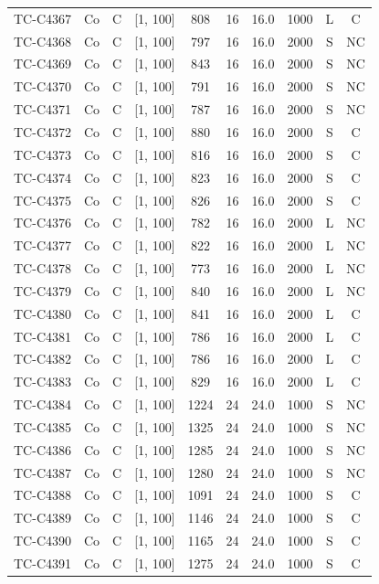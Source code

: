 \begin{longtable}{lccccccccc}
TC-C4367 & Co & C & [1, 100] & 808 & 16 & 16.0 & 1000 & L & C \\
TC-C4368 & Co & C & [1, 100] & 797 & 16 & 16.0 & 2000 & S & NC \\
TC-C4369 & Co & C & [1, 100] & 843 & 16 & 16.0 & 2000 & S & NC \\
TC-C4370 & Co & C & [1, 100] & 791 & 16 & 16.0 & 2000 & S & NC \\
TC-C4371 & Co & C & [1, 100] & 787 & 16 & 16.0 & 2000 & S & NC \\
TC-C4372 & Co & C & [1, 100] & 880 & 16 & 16.0 & 2000 & S & C \\
TC-C4373 & Co & C & [1, 100] & 816 & 16 & 16.0 & 2000 & S & C \\
TC-C4374 & Co & C & [1, 100] & 823 & 16 & 16.0 & 2000 & S & C \\
TC-C4375 & Co & C & [1, 100] & 826 & 16 & 16.0 & 2000 & S & C \\
TC-C4376 & Co & C & [1, 100] & 782 & 16 & 16.0 & 2000 & L & NC \\
TC-C4377 & Co & C & [1, 100] & 822 & 16 & 16.0 & 2000 & L & NC \\
TC-C4378 & Co & C & [1, 100] & 773 & 16 & 16.0 & 2000 & L & NC \\
TC-C4379 & Co & C & [1, 100] & 840 & 16 & 16.0 & 2000 & L & NC \\
TC-C4380 & Co & C & [1, 100] & 841 & 16 & 16.0 & 2000 & L & C \\
TC-C4381 & Co & C & [1, 100] & 786 & 16 & 16.0 & 2000 & L & C \\
TC-C4382 & Co & C & [1, 100] & 786 & 16 & 16.0 & 2000 & L & C \\
TC-C4383 & Co & C & [1, 100] & 829 & 16 & 16.0 & 2000 & L & C \\
TC-C4384 & Co & C & [1, 100] & 1224 & 24 & 24.0 & 1000 & S & NC \\
TC-C4385 & Co & C & [1, 100] & 1325 & 24 & 24.0 & 1000 & S & NC \\
TC-C4386 & Co & C & [1, 100] & 1285 & 24 & 24.0 & 1000 & S & NC \\
TC-C4387 & Co & C & [1, 100] & 1280 & 24 & 24.0 & 1000 & S & NC \\
TC-C4388 & Co & C & [1, 100] & 1091 & 24 & 24.0 & 1000 & S & C \\
TC-C4389 & Co & C & [1, 100] & 1146 & 24 & 24.0 & 1000 & S & C \\
TC-C4390 & Co & C & [1, 100] & 1165 & 24 & 24.0 & 1000 & S & C \\
TC-C4391 & Co & C & [1, 100] & 1275 & 24 & 24.0 & 1000 & S & C \\

\end{longtable}
